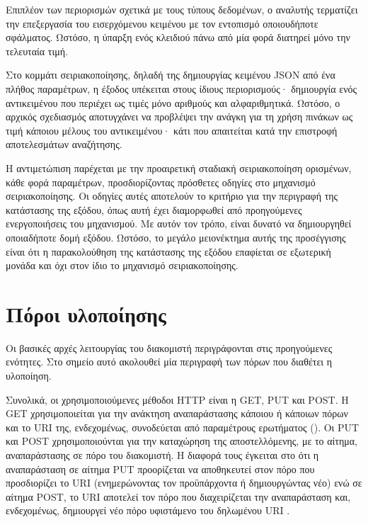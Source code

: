 Επιπλέον των περιορισμών σχετικά με τους τύπους δεδομένων, ο αναλυτής τερματίζει
την επεξεργασία του εισερχόμενου κειμένου με τον εντοπισμό οποιουδήποτε
σφάλματος. Ωστόσο, η ύπαρξη ενός κλειδιού πάνω από μία φορά διατηρεί μόνο την
τελευταία τιμή.

Στο κομμάτι σειριακοποίησης, δηλαδή της δημιουργίας κειμένου JSON από ένα πλήθος
παραμέτρων, η έξοδος υπέκειται στους ίδιους περιορισμούς· δημιουργία ενός
αντικειμένου που περιέχει ως τιμές μόνο αριθμούς και αλφαριθμητικά. Ωστόσο, ο
αρχικός σχεδιασμός αποτυγχάνει να προβλέψει την ανάγκη για τη χρήση πινάκων ως
τιμή κάποιου μέλους του αντικειμένου· κάτι που απαιτείται κατά την επιστροφή
αποτελεσμάτων αναζήτησης.

Η αντιμετώπιση παρέχεται με την προαιρετική σταδιακή σειριακοποίηση ορισμένων,
κάθε φορά παραμέτρων, προσδιορίζοντας πρόσθετες οδηγίες στο μηχανισμό
σειριακοποίησης. Οι οδηγίες αυτές αποτελούν το κριτήριο για την περιγραφή της
κατάστασης της εξόδου, όπως αυτή έχει διαμορφωθεί από προηγούμενες
ενεργοποιήσεις του μηχανισμού. Με αυτόν τον τρόπο, είναι δυνατό να δημιουργηθεί
οποιαδήποτε δομή εξόδου. Ωστόσο, το μεγάλο μειονέκτημα αυτής της προσέγγισης
είναι ότι η παρακολούθηση της κατάστασης της εξόδου επαφίεται σε εξωτερική
μονάδα και όχι στον ίδιο το μηχανισμό σειριακοποίησης.


\section{Πόροι υλοποίησης}


Οι βασικές αρχές λειτουργίας του διακομιστή περιγράφονται στις προηγούμενες
ενότητες. Στο σημείο αυτό ακολουθεί μία περιγραφή των πόρων που διαθέτει η
υλοποίηση.

Συνολικά, οι χρησιμοποιούμενες μέθοδοι HTTP είναι η GET, PUT και POST. Η GET
χρησιμοποιείται για την ανάκτηση αναπαράστασης κάποιου ή κάποιων πόρων και το
URI της, ενδεχομένως, συνοδεύεται από παραμέτρους ερωτήματος
(). Οι PUT και POST χρησιμοποιούνται για την καταχώρηση της
αποστελλόμενης, με το αίτημα, αναπαράστασης σε πόρο του διακομιστή. Η διαφορά
τους έγκειται στο ότι η αναπαράσταση σε αίτημα PUT προορίζεται να αποθηκευτεί
στον πόρο που προσδιορίζει το URI (ενημερώνοντας τον προϋπάρχοντα ή
δημιουργώντας νέο) ενώ σε αίτημα POST, το URI αποτελεί τον πόρο που
διαχειρίζεται την αναπαράσταση και, ενδεχομένως, δημιουργεί νέο πόρο υφιστάμενο
του δηλωμένου URI \parencite[54--55]{rfc2616}.


